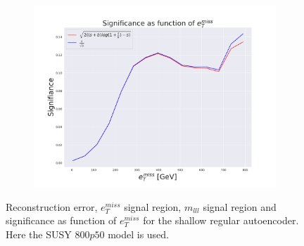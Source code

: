 \begin{figure}[H]
    \hfill  
    \begin{subfigure}{.40\textwidth}
        \includegraphics[width=\textwidth]{Figures/VAE_testing/small/2lep/significance_etmiss_800p0p050_-0.4271074800379211.pdf}
        \caption{}
        \label{fig:VAE_2lep_small_signi_800_3}
    \end{subfigure}
    \hfill      
    \caption[2lep shallow network | $800p50$ | VAE | 3]{Reconstruction error, $e_T^{miss}$ signal region, $m_{lll}$ signal region and significance as function of 
    $e_T^{miss}$ for the shallow regular autoencoder. Here the SUSY $800p50$ model is used.}
    \label{fig:VAE_2lep_small_rec_sig_signi_800_3}
\end{figure}


